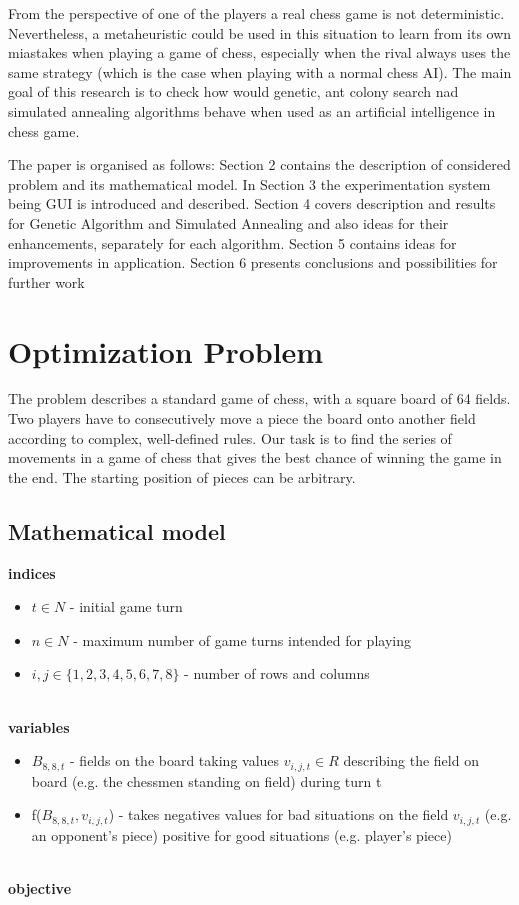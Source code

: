 \documentclass[pdftex]{article}
\begin{document}
From the perspective of one of the players a real chess game is not deterministic. Nevertheless, a metaheuristic could be used in this situation to learn from its own miastakes when playing a game of chess, especially when the rival always uses the same strategy (which is the case when playing with a normal chess AI). The main goal of this research is to check how would genetic, ant colony search nad simulated annealing algorithms behave when used as an artificial intelligence in chess game.


The paper is organised as follows: Section 2 contains the description of considered problem and its mathematical model. In Section 3 the experimentation system being GUI is introduced and described. Section 4 covers description and results for Genetic Algorithm and Simulated Annealing and also ideas for their enhancements, separately for each algorithm. Section 5 contains ideas for improvements in application. Section 6 presents conclusions and possibilities for further work

\section{Optimization Problem}
\label{sec:problem}

The problem describes a standard game of chess, with a square board of 64 fields. Two players have to consecutively move a piece the board onto another field according to complex, well-defined rules. Our task is to find the series of movements in a game of chess that gives the best chance of winning the game in the end. The starting position of pieces can be arbitrary. 

\subsection{Mathematical model}
\label{sec:model}

\textbf{indices}
\begin{itemize}
 	\item $t \in N$ - initial game turn 
 	\item $n \in N$ - maximum number of game turns intended for playing 
 	\item $i,j \in \{1,2,3,4,5,6,7,8\}$ - number of rows and columns
\end{itemize}
\\
\textbf{variables}
\begin{itemize}
 	\item $B_{8,8,t}$ - fields on the board taking values $v_{i,j,t}\in R$ describing the field on board (e.g. the chessmen standing on field) during turn t
 	\item f($B_{8,8,t},v_{i,j,t}$) - takes negatives values for bad situations on the field $v_{i,j,t}$ (e.g. an opponent's piece) positive for good situations (e.g. player's piece)
\end{itemize}
\\
\textbf{objective}
\end{document}
